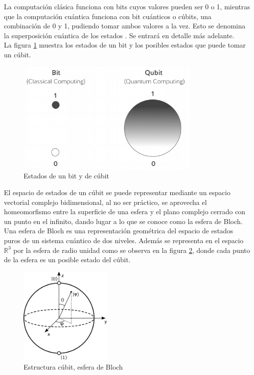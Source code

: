 La computación clásica funciona con bits cuyos valores pueden ser 0 o 1, mientras que la computación cuántica funciona con bit cuánticos o cúbits, una combinación de 0 y 1, pudiendo tomar ambos valores a la vez. Esto se denomina la superposición cuántica de los estados \cite{computacion-cuantica-criptografia}. Se entrará en detalle más adelante.\\

La figura \ref{fig:bit-cubit} muestra los estados de un bit y los posibles estados que puede tomar un cúbit. \\

\begin{figure}[H]
	\centering
	\includegraphics[width=0.8\textwidth]{figuras/bit_cubit.png}
	\caption{Estados de un bit y de cúbit \cite{clasica-vs-cuantica}}
	\label{fig:bit-cubit}
\end{figure}

El espacio de estados de un cúbit se puede representar mediante un espacio vectorial complejo bidimensional, al no ser práctico, se aprovecha el homeomorfismo entre la superficie de una esfera y el plano complejo cerrado con un punto en el infinito, dando lugar a lo que se conoce como la esfera de Bloch.\\

Una esfera de Bloch es una representación geométrica del espacio de estados puros de un sistema cuántico de dos niveles. Además se representa en el espacio $\mathds{R}^3$ por la esfera de radio unidad como se observa en la figura \ref{fig:esfera-bloch}, donde cada punto de la esfera es un posible estado del cúbit.\\


\begin{figure}[H]
	\centering
	\includegraphics[width=0.4\textwidth]{figuras/esfera_bloch.png}
	\caption{Estructura cúbit, esfera de Bloch \cite{esfera-bloch}}
	\label{fig:esfera-bloch}
\end{figure}

